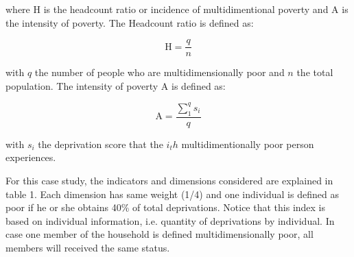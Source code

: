 \documentclass[a4paper, 11pt]{article}
\begin{document}
where H is the headcount ratio or incidence of multidimentional poverty and A is the intensity of poverty. The Headcount ratio is defined as:

\begin{equation*}
    \text{H} = \frac{q}{n}
\end{equation*}

with $q$ the number of people who are multidimensionally poor and $n$ the total population. The intensity of poverty A is defined as: 

\begin{equation*}
    \text{A} = \frac{\sum_{1}^{q} s_i}{q}
\end{equation*}


with $s_i$ the deprivation score that the $i_th$ multidimentionally poor person experiences. 



For this case study, the indicators and dimensions considered are explained in table 1. Each dimension has same weight (1/4) and one individual is defined as poor if he or she obtains 40\% of total deprivations. Notice that this index is based on individual information, i.e. quantity of deprivations by individual. In case one member of the household is defined multidimensionally poor, all members will received the same status. 
\end{document}
